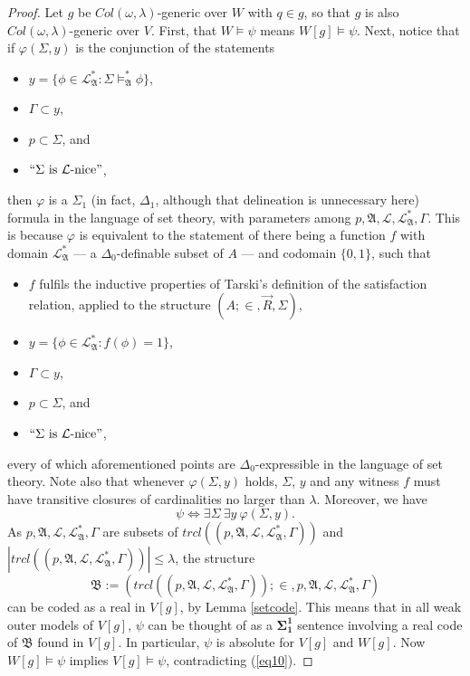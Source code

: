 \documentclass[12pt]{article}
\numberwithin{equation}{section}
\begin{document}
\begin{proof}
Let $g$ be $Col(\omega, \lambda)$-generic over $W$ with $q \in g$, so that $g$ is also $Col(\omega, \lambda)$-generic over $V$. First, that $W \models \psi$ means $W[g] \models \psi$. Next, notice that if $\varphi(\Sigma, y)$ is the conjunction of the statements
\begin{itemize}
    \item $y = \{\phi \in \mathcal{L}^*_{\mathfrak{A}} : \Sigma \models^*_{\mathfrak{A}} \phi\}$,
    \item $\Gamma \subset y$, 
    \item $p \subset \Sigma$, and
    \item $``\Sigma \text{ is } \mathcal{L}\text{-nice}"$, 
\end{itemize}
then $\varphi$ is a $\Sigma_1$ (in fact, $\Delta_1$, although that delineation is unnecessary here) formula in the language of set theory, with parameters among $p, \mathfrak{A}, \mathcal{L}, \mathcal{L}^*_{\mathfrak{A}}, \Gamma$. This is because $\varphi$ is equivalent to the statement of there being a function $f$ with domain $\mathcal{L}^*_{\mathfrak{A}}$ --- a $\Delta_0$-definable subset of $A$ --- and codomain $\{0, 1\}$, such that 
\begin{itemize}
    \item $f$ fulfils the inductive properties of Tarski's definition of the satisfaction relation, applied to the structure $(A; \in, \Vec{R}, \Sigma)$,
    \item $y = \{\phi \in \mathcal{L}^*_{\mathfrak{A}} : f(\phi) = 1\}$, 
    \item $\Gamma \subset y$,
    \item $p \subset \Sigma$, and
    \item $``\Sigma \text{ is } \mathcal{L}\text{-nice}"$,
\end{itemize}
every of which aforementioned points are $\Delta_0$-expressible in the language of set theory. Note also that whenever $\varphi(\Sigma, y)$ holds, $\Sigma$, $y$ and any witness $f$ must have transitive closures of cardinalities no larger than $\lambda$. Moreover, we have $$\psi \iff \exists \Sigma \ \exists y \ \varphi(\Sigma, y).$$ As $p, \mathfrak{A}, \mathcal{L}, \mathcal{L}^*_{\mathfrak{A}}, \Gamma$ are subsets of $trcl((p, \mathfrak{A}, \mathcal{L}, \mathcal{L}^*_{\mathfrak{A}}, \Gamma))$ and $|trcl((p, \mathfrak{A}, \mathcal{L}, \mathcal{L}^*_{\mathfrak{A}}, \Gamma))| \leq \lambda$, the structure $$\mathfrak{B} := (trcl((p, \mathfrak{A}, \mathcal{L}, \mathcal{L}^*_{\mathfrak{A}}, \Gamma)); \in, p, \mathfrak{A}, \mathcal{L}, \mathcal{L}^*_{\mathfrak{A}}, \Gamma)$$ can be coded as a real in $V[g]$, by Lemma \ref{setcode}. This means that in all weak outer models of $V[g]$, $\psi$ can be thought of as a $\mathbf{\Sigma^1_1}$ sentence involving a real code of $\mathfrak{B}$ found in $V[g]$. In particular, $\psi$ is absolute for $V[g]$ and $W[g]$. Now $W[g] \models \psi$ implies $V[g] \models \psi$, contradicting (\ref{eq10}).
\end{proof}
\end{document}
